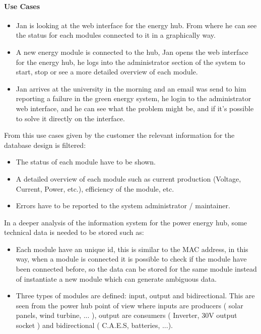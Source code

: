 \paragraph{Use Cases}
	\begin{itemize}
		\item Jan is looking at the web interface for the energy hub. From where he can see the status for each modules connected to it
in a graphically way.
		\item A new energy module is connected to the hub, Jan opens the web interface for the energy hub, he logs into the administrator section of the system
to start, stop or see a more detailed overview of each module.
		\item Jan arrives at the university in the morning and an email was send to him reporting a failure in the green energy system, he login to the administrator web interface, and he can see what the problem might be, and if it's possible to solve it directly on the interface.
	\end{itemize}
From this use cases given by the customer the relevant information for the database design is filtered:
	\begin{itemize}
		\item The status of each module have to be shown.
		\item A detailed overview of each module such as current production (Voltage, Current, Power, etc.), efficiency of the module, etc.
		\item Errors have to be reported to the system administrator / maintainer.
	\end{itemize}
In a deeper analysis of the information system for the power energy hub, some technical data is needed to be stored such as:
	\begin{itemize}
		\item Each module have an unique id, this is similar to the MAC address, in this way, when a module is connected it is possible to check if the module have been connected before, so the data can be stored for the same module instead of instantiate a new module which can generate ambiguous data.
		\item Three types of modules are defined: input, output and bidirectional. This are seen from the power hub point of view where inputs are producers ( solar panels, wind turbine, ... ), output are consumers ( Inverter, 30V output socket ) and bidirectional ( C.A.E.S, batteries, ...).
	\end{itemize}

